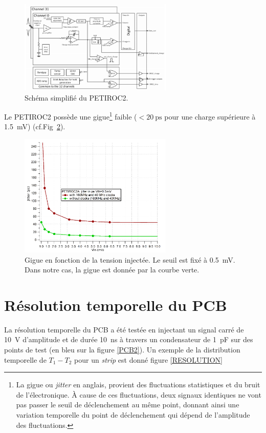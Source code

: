 \begin{figure}[ht!]
	\centering
	\includegraphics[width=0.65\textwidth]{ELE/Scheme.png}
	\captionsetup{type=figure}\caption{Schéma simplifié du PETIROC2.}
	\label{SchemePETIROC}
\end{figure}

Le PETIROC2 possède une gigue\footnote{La gigue ou \textit{jitter} en anglais, provient des fluctuations statistiques et du bruit de l'électronique. À cause de ces fluctuations, deux signaux identiques ne vont pas passer le seuil de déclenchement au même point, donnant ainsi une variation temporelle du point de déclenchement qui dépend de l'amplitude des fluctuations.} faible ($<\SI{20}{\pico\second}$ pour une charge supérieure à \SI{1.5}{\milli\volt}) (cf.Fig~\ref{jitter}).

\begin{figure}[ht!]
	\centering
	\includegraphics[width=0.65\textwidth]{ELE/Jitter.png}
	\captionsetup{type=figure}\caption{Gigue en fonction de la tension injectée. Le seuil est fixé à \SI{0.5}{\milli\volt}. Dans notre cas, la gigue est donnée par la courbe verte.}
	\label{jitter}
\end{figure}

\vspace{0.4cm}
\section{Résolution temporelle du PCB}
La résolution temporelle du PCB a été testée en injectant un signal carré de \SI{10}{\volt} d'amplitude et de durée \SI{10}{\nano\second} à travers un condensateur de \SI{1}{\pico\farad} sur des points de test (en bleu sur la figure \ref{PCB2}). Un exemple de la distribution temporelle de $T_{1}-T_{2}$ pour un \textit{strip} est donné figure \ref{RESOLUTION}

